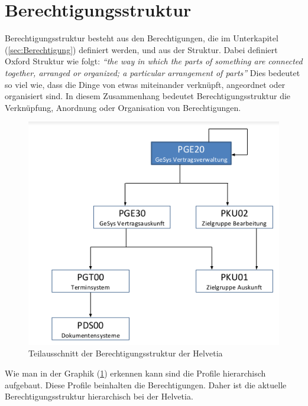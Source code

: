 \section{Berechtigungsstruktur}
\label{sec:Berechtigungsstruktur}
Berechtigungsstruktur besteht aus den Berechtigungen, die im Unterkapitel (\ref{sec:Berechtigung}) definiert werden, und aus der Struktur.
Dabei definiert Oxford Struktur wie folgt:
\newline
\newline
\textit{"`the way in which the parts of something are connected together, arranged or organized; a particular arrangement of parts"'} \cite{Struct}
\newline
\newline
Dies bedeutet so viel wie, dass die Dinge von etwas miteinander verknüpft, angeordnet oder organisiert sind. \cite{Struct}
\newline
In diesem Zusammenhang bedeutet Berechtigungsstruktur die Verknüpfung, Anordnung oder Organisation von Berechtigungen.
\begin{figure}[h!]
 \centering
 \includegraphics[width=1\textwidth]{gfx/Picture/Struktur.PNG}
 \caption{Teilausschnitt der Berechtigungsstruktur der Helvetia}
 \label{fig:Teil}
\end{figure}
Wie man in der Graphik (\ref{fig:Teil}) erkennen kann sind die Profile hierarchisch aufgebaut.
Diese Profile beinhalten die Berechtigungen.
Daher ist die aktuelle Berechtigungsstruktur hierarchisch bei der Helvetia.


